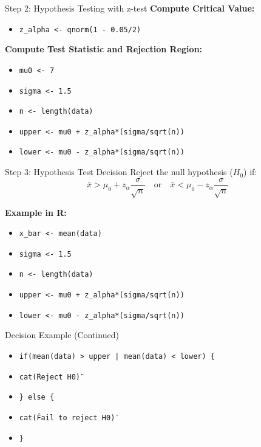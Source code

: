 \documentclass{beamer}
\begin{document}
\begin{frame}{Step 2: Hypothesis Testing with z-test}
\textbf{Compute Critical Value:}
\begin{itemize}
    \item \texttt{z\_alpha <- qnorm(1 - 0.05/2)}
\end{itemize}

\textbf{Compute Test Statistic and Rejection Region:}
\begin{itemize}
    \item \texttt{mu0 <- 7}
    \item \texttt{sigma <- 1.5}
    \item \texttt{n <- length(data)}
    \item \texttt{upper <- mu0 + z\_alpha*(sigma/sqrt(n))}
    \item \texttt{lower <- mu0 - z\_alpha*(sigma/sqrt(n))}
\end{itemize}
\end{frame}

\begin{frame}{Step 3: Hypothesis Test Decision}
Reject the null hypothesis ($H_0$) if:
\[
\bar{x} > \mu_0 + z_{\alpha}\frac{\sigma}{\sqrt{n}} \quad\text{or}\quad \bar{x} < \mu_0 - z_{\alpha}\frac{\sigma}{\sqrt{n}}
\]

\textbf{Example in R:}
\begin{itemize}
    \item \texttt{x\_bar <- mean(data)}
    \item \texttt{sigma <- 1.5}
    \item \texttt{n <- length(data)}
    \item \texttt{upper <- mu0 + z\_alpha*(sigma/sqrt(n))}
    \item \texttt{lower <- mu0 - z\_alpha*(sigma/sqrt(n))}
\end{itemize}
\end{frame}

\begin{frame}{Decision Example (Continued)}
\begin{itemize}
    \item \texttt{if(mean(data) > upper | mean(data) < lower) \{}
    \item \quad \texttt{cat(\"Reject H0\")}
    \item \texttt{\} else \{}
    \item \quad \texttt{cat(\"Fail to reject H0\")}
    \item \texttt{\}}
\end{itemize}
\end{frame}
\end{document}
